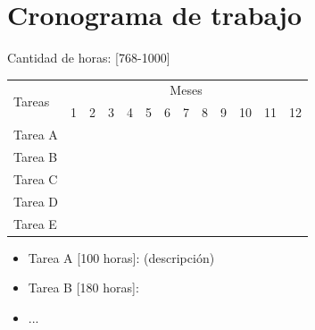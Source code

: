 \documentclass[12pt]{article}
\begin{document}
\section{Cronograma de trabajo}

Cantidad de horas: [768-1000]

\bigskip

\begin{center}
    \def\arraystretch{1.5}
    \begin{tabular}{ |l|c|c|c|c|c|c|c|c|c|c|c|c| }

        \hline
        \multirow{2}{1em}{Tareas} & \multicolumn{12}{|c|}{Meses}                                                                                                                                                                      \\  \cline{2-13} &
        1                         & 2                            & 3                & 4                & 5                & 6                & 7                & 8 & 9 & 10 & 11               & 12                                  \\  \hline
        Tarea A                   & \cellcolor{gray}             & \cellcolor{gray} &                  &                  &                  &                  &   &   &    &                  &                  &                  \\
        \hline
        Tarea B                   &                              & \cellcolor{gray} & \cellcolor{gray} &                  &                  &                  &   &   &    &                  &                  &                  \\
        \hline
        Tarea C                   &                              & \cellcolor{gray} & \cellcolor{gray} & \cellcolor{gray} & \cellcolor{gray} & \cellcolor{gray} &   &   &    &                  &                  &                  \\
        \hline
        Tarea D                   &                              &                  &                  &                  &                  &                  &   &   &    &                  &                  &                  \\
        \hline
        Tarea E                   &                              &                  &                  &                  &                  &                  &   &   &    & \cellcolor{gray} & \cellcolor{gray} & \cellcolor{gray} \\
        \hline
    \end{tabular}
\end{center}

\bigskip

\begin{itemize}
    \item Tarea A [100 horas]: (descripción)
    \item Tarea B [180 horas]:
    \item ...
\end{itemize}

\bigskip



\end{document}
